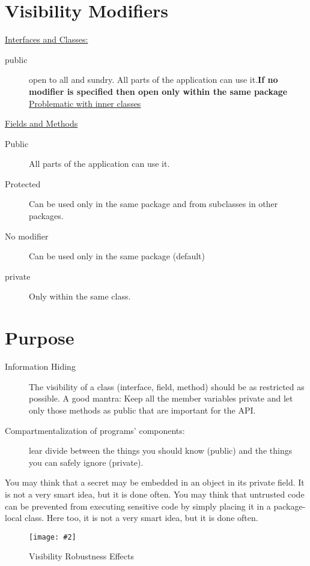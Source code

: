 \documentclass[a4paper,10pt]{scrreprt}
\newcommand{\pic}[2][figure]{\begin{figure}[h]
 \centering
 \texttt{[image: \#2]}
 \caption{#1}
\end{figure}
}
\begin{document}
\section{Visibility Modifiers}
\underline{Interfaces and Classes:}
\begin{description}
 \item [public] open to all and sundry. All parts of the application can use it.\textbf{If no modifier is specified 
then open only within the same package} \underline{Problematic with inner classes}
\end{description}
\underline{Fields and Methods}
\begin{description}
 \item [Public] All parts of the application can use it.
 \item [Protected] Can be used only in the same package and from subclasses in other packages.
 \item [No modifier] Can be used only in the same package (default)
 \item [private] Only within the same class. 
 
\end{description}

\section{Purpose}
\begin{description}
 \item [Information Hiding] The visibility of a class (interface, field, method)
should be as restricted as possible. A good mantra: Keep all the
member variables private and let only those methods as public that are
important for the API.
\item [Compartmentalization of programs' components:]lear divide between
the things you should know (public) and the things you can safely
ignore (private).

\end{description}
\begin{framed}
 You may think that a secret may be embedded in an object in its private
field. It is not a very smart idea, but it is done often.
You may think that untrusted code can be prevented from executing
sensitive code by simply placing it in a package-local class. Here too, it is
not a very smart idea, but it is done often.
\end{framed}

\pic[Visibility Robustness Effects]{vbre.png}
\end{document}

